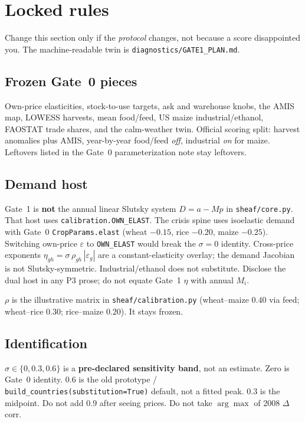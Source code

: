\section{Locked rules}
\label{sec:locked}

Change this section only if the \emph{protocol} changes, not because a
score disappointed you. The machine-readable twin is
\texttt{diagnostics/GATE1\_PLAN.md}.

\subsection{Frozen Gate~0 pieces}

Own-price elasticities, stock-to-use targets, ask and warehouse knobs, the
AMIS map, LOWESS harvests, mean food/feed, US maize industrial/ethanol,
FAOSTAT trade shares, and the calm-weather twin. Official scoring split:
harvest anomalies plus AMIS, year-by-year food/feed \emph{off}, industrial
\emph{on} for maize. Leftovers listed in the Gate~0 parameterization note
stay leftovers.

\subsection{Demand host}

Gate~1 is \textbf{not} the annual linear Slutsky system
\(D=a-Mp\) in \texttt{sheaf/core.py}. That host uses
\texttt{calibration.OWN\_ELAST}. The crisis spine uses isoelastic demand
with Gate~0 \texttt{CropParams.elast} (wheat \(-0.15\), rice \(-0.20\),
maize \(-0.25\)). Switching own-price \(\varepsilon\) to
\texttt{OWN\_ELAST} would break the \(\sigma=0\) identity. Cross-price
exponents \(\eta_{gh}=\sigma\,\rho_{gh}\,|\varepsilon_g|\) are a
constant-elasticity overlay; the demand Jacobian is not
Slutsky-symmetric. Industrial/ethanol does not substitute. Disclose the
dual host in any P3 prose; do not equate Gate~1 \(\eta\) with annual
\(M_i\).

\(\rho\) is the illustrative matrix in \texttt{sheaf/calibration.py}
(wheat--maize \(0.40\) via feed; wheat--rice \(0.30\); rice--maize
\(0.20\)). It stays frozen.

\subsection{Identification}

\(\sigma\in\{0,0.3,0.6\}\) is a \textbf{pre-declared sensitivity band}, not
an estimate. Zero is Gate~0 identity. \(0.6\) is the old prototype /
\texttt{build\_countries(substitution=True)} default, not a fitted peak.
\(0.3\) is the midpoint. Do not add \(0.9\) after seeing prices. Do not
take \(\arg\max\) of 2008 \(\Delta\)corr.

